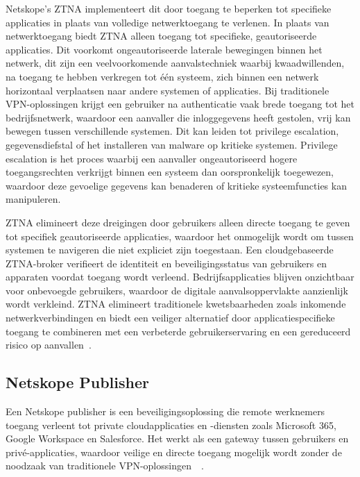 \vspace{2ex}

Netskope’s ZTNA implementeert dit door toegang te beperken tot specifieke applicaties in plaats van volledige netwerktoegang te verlenen. In plaats van netwerktoegang biedt ZTNA alleen toegang tot specifieke, geautoriseerde applicaties. Dit voorkomt ongeautoriseerde laterale bewegingen binnen het netwerk, dit zijn een veelvoorkomende aanvalstechniek waarbij kwaadwillenden, na toegang te hebben verkregen tot één systeem, zich binnen een netwerk horizontaal verplaatsen naar andere systemen of applicaties. Bij traditionele VPN-oplossingen krijgt een gebruiker na authenticatie vaak brede toegang tot het bedrijfsnetwerk, waardoor een aanvaller die inloggegevens heeft gestolen, vrij kan bewegen tussen verschillende systemen. Dit kan leiden tot privilege escalation, gegevensdiefstal of het installeren van malware op kritieke systemen. Privilege escalation is het proces waarbij een aanvaller ongeautoriseerd hogere toegangsrechten verkrijgt binnen een systeem dan oorspronkelijk toegewezen, waardoor deze gevoelige gegevens kan benaderen of kritieke systeemfuncties kan manipuleren. 

\vspace{2ex}

ZTNA elimineert deze dreigingen door gebruikers alleen directe toegang te geven tot specifiek geautoriseerde applicaties, waardoor het onmogelijk wordt om tussen systemen te navigeren die niet expliciet zijn toegestaan. Een cloudgebaseerde ZTNA-broker verifieert de identiteit en beveiligingsstatus van gebruikers en apparaten voordat toegang wordt verleend. Bedrijfsapplicaties blijven onzichtbaar voor onbevoegde gebruikers, waardoor de digitale aanvalsoppervlakte aanzienlijk wordt verkleind. ZTNA elimineert traditionele kwetsbaarheden zoals inkomende netwerkverbindingen en biedt een veiliger alternatief door applicatiespecifieke toegang te combineren met een verbeterde gebruikerservaring en een gereduceerd risico op aanvallen~\autocite{Netskope2025-5}.

\subsection{Netskope Publisher}
Een Netskope publisher is een beveiligingsoplossing die remote werknemers toegang verleent tot private cloudapplicaties en -diensten zoals Microsoft 365, Google Workspace en Salesforce. Het werkt als een gateway tussen gebruikers en privé-applicaties, waardoor veilige en directe toegang mogelijk wordt zonder de noodzaak van traditionele VPN-oplossingen~\autocite{Netskope2025-6}~\autocite{Netskope2025-7}.

